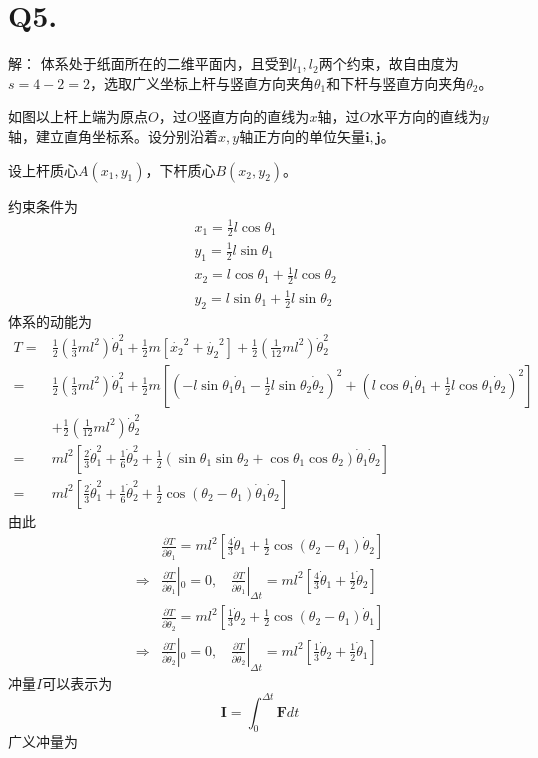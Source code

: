 \documentclass[10pt,a4paper]{article}
\begin{document}
\section*{Q5.}解：
体系处于纸面所在的二维平面内，且受到$l_1,l_2$两个约束，故自由度为$s=4-2=2$，选取广义坐标上杆与竖直方向夹角$\theta_1$和下杆与竖直方向夹角$\theta_2$。

\noindent 如图以上杆上端为原点$O$，过$O$竖直方向的直线为$x$轴，过$O$水平方向的直线为$y$轴，建立直角坐标系。设分别沿着$x,y$轴正方向的单位矢量$\bm{i},\bm{j}$。

\noindent 设上杆质心$A(x_1,y_1)$，下杆质心$B(x_2,y_2)$。

\noindent 约束条件为
\begin{align*}
&x_1 = \frac{1}{2}l\cos\theta_1\\
&y_1 = \frac{1}{2}l\sin\theta_1\\
&x_2 = l\cos\theta_1+\frac{1}{2}l\cos\theta_2\\
&y_2 = l\sin\theta_1+\frac{1}{2}l\sin\theta_2
\end{align*}
体系的动能为
\begin{align*}
T =&\frac{1}{2}(\frac{1}{3}ml^2)\dot{\theta}_1^2+\frac{1}{2}m[\dot{x_2}^2+\dot{y_2}^2]+\frac{1}{2}(\frac{1}{12}ml^2)\dot{\theta}_2^2\\
=&\frac{1}{2}(\frac{1}{3}ml^2)\dot{\theta}_1^2+\frac{1}{2}m[(-l\sin\theta_1\dot{\theta}_1-\frac{1}{2}l\sin\theta_2\dot{\theta}_2)^2+(l\cos\theta_1\dot{\theta}_1+\frac{1}{2}l\cos\theta_1\dot{\theta}_2)^2]\\
&+\frac{1}{2}(\frac{1}{12}ml^2)\dot{\theta}_2^2\\
=&ml^2[\frac{2}{3}\dot{\theta}_1^2+\frac{1}{6}\dot{\theta}_2^2+\frac{1}{2}(\sin\theta_1\sin\theta_2+\cos\theta_1\cos\theta_2)\dot{\theta}_1\dot{\theta}_2]\\
=&ml^2[\frac{2}{3}\dot{\theta}_1^2+\frac{1}{6}\dot{\theta}_2^2+\frac{1}{2}\cos(\theta_2-\theta_1)\dot{\theta}_1\dot{\theta}_2]
\end{align*}
由此
\begin{align*}
&\frac{\partial T}{\partial\dot{\theta}_1} = ml^2[\frac{4}{3}\dot{\theta}_1+\frac{1}{2}\cos(\theta_2-\theta_1)\dot{\theta}_2]\\
\Longrightarrow&\frac{\partial T}{\partial\dot{\theta}_1}|_{0} = 0,~~~~\frac{\partial T}{\partial\dot{\theta}_1}|_{\Delta t}=ml^2[\frac{4}{3}\dot{\theta}_1+\frac{1}{2}\dot{\theta}_2]\\
&\frac{\partial T}{\partial\dot{\theta}_2} = ml^2[\frac{1}{3}\dot{\theta}_2+\frac{1}{2}\cos(\theta_2-\theta_1)\dot{\theta}_1]\\
\Longrightarrow&\frac{\partial T}{\partial\dot{\theta}_2}|_{0} = 0,~~~~\frac{\partial T}{\partial\dot{\theta}_2}|_{\Delta t} = ml^2[\frac{1}{3}\dot{\theta}_2+\frac{1}{2}\dot{\theta}_1]
\end{align*}
冲量$I$可以表示为
\[
\bm{I} = \int_0^{\Delta t}\bm{F}dt
\]
广义冲量为
\end{document}
